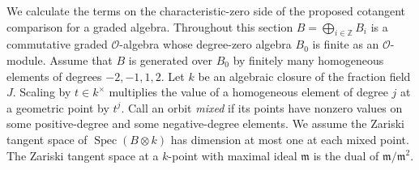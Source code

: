 \documentclass[a4paper,11pt]{article}
\theoremstyle{definition}
\theoremstyle{remark}
\newcommand{\ZZ}{\mathbb Z}\newcommand{\ord}{\operatorname{ord}}
\numberwithin{equation}{section}
\newcommand{\OO}{\mathcal O}
\begin{document}
We calculate the terms on the characteristic-zero side of the proposed cotangent comparison for a graded algebra. Throughout this section \(B=\bigoplus_{i\in\ZZ}B_i\) is a commutative graded \(\OO\)-algebra whose degree-zero algebra \(B_0\) is finite as an \(\OO\)-module. Assume that \(B\) is generated over \(B_0\) by finitely many homogeneous elements of degrees \(-2,-1,1,2\). Let \(k\) be an algebraic closure of the fraction field \(J\). Scaling by \(t\in k^\times\) multiplies the value of a homogeneous element of degree \(j\) at a geometric point by \(t^j\). Call an orbit \emph{mixed} if its points have nonzero values on some positive-degree and some negative-degree elements. We assume the Zariski tangent space of \(\operatorname{Spec}(B\otimes k)\) has dimension at most one at each mixed point. The Zariski tangent space at a \(k\)-point with maximal ideal \(\mathfrak m\) is the dual of \(\mathfrak m/\mathfrak m^2\).
\end{document}
